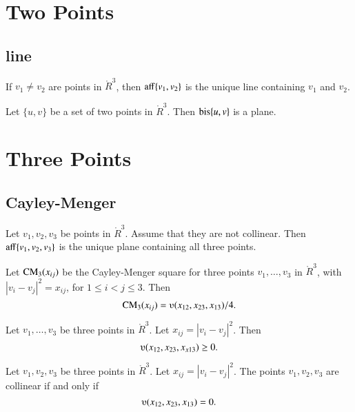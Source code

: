 \newpage
\section{Two Points}

\subsection{line}

\begin{lemma}
	If $v_1\ne v_2$ are points in $\ring{R}^3$, then ${\operatorname{aff}}\{v_1,v_2\}$ is the unique
line containing $v_1$ and $v_2$.
\end{lemma}

\newpage

\begin{lemma}
Let $\{u,v\}$ be a set of two points in 
$\ring{R}^3$.  Then ${\operatorname{bis}}\{u,v\}$ is a plane.
\end{lemma}

\section{Three Points}

\subsection{Cayley-Menger}



\begin{lemma}
	Let $v_1,v_2,v_3$ be points in $\ring{R}^3$.  Assume that they are not collinear.
Then ${\operatorname{aff}}\{v_1,v_2,v_3\}$ is the unique plane containing all three points.
\end{lemma}

\begin{lemma}
	Let ${\operatorname{CM}}_3(x_{ij})$ be the Cayley-Menger square for
three points $v_1,\ldots,v_3$ in $\ring{R}^3$, with $|v_i-v_j|^2 = x_{ij}$,
for $1\le i < j \le 3$.  Then
	$$\op{CM}_3(x_{ij}) = \ups(x_{12},x_{23},x_{13})/4.$$
\end{lemma}

\begin{lemma}
Let $v_1,\ldots,v_3$ be three points
in $\ring{R}^3$.  Let $x_{ij} = |v_i-v_j|^2$.  Then
	$$\ups(x_{12},x_{23},x_{x13})\ge0.$$
\end{lemma}

\begin{lemma}\label{tarski:ups0}
Let $v_1,v_2,v_3$ be three points
in $\ring{R}^3$.  Let $x_{ij} = |v_i-v_j|^2$.
The points $v_1,v_2,v_3$ are collinear if and only if
	$$\ups(x_{12},x_{23},x_{13}) = 0.$$
\end{lemma}

